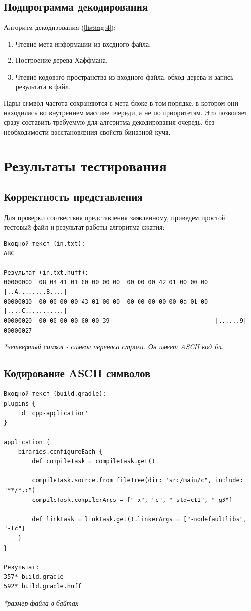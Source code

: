 \documentclass[12pt, a4paper]{article}
\begin{document}
\subsection{Подпрограмма декодирования}
Алгоритм декодирования (\ref{listing:4}):
\begin{enumerate}
  \item Чтение мета информации из входного файла.
  \item Построение дерева Хаффмана.
  \item Чтение кодового пространства из входного файла, обход дерева и
  запись результата в файл.
\end{enumerate}
Пары символ-частота сохраняются в мета блоке в том порядке, в котором они
находились во внутреннем массиве очереди, а не по приоритетам. Это позволяет
сразу составить требуемую для алгоритма декодирования очередь, без
необходимости восстановления свойств бинарной кучи.

\section{Результаты тестирования}
\subsection{Корректность представления}
Для проверки соотвествия представления заявленному, приведем простой
тестовый файл и результат работы алгоритма сжатия:\\
\begin{verbatim}
Входной текст (in.txt):
ABC

Результат (in.txt.huff):
00000000  08 04 41 01 00 00 00 00  00 00 00 42 01 00 00 00  |..A........B....|
00000010  00 00 00 00 43 01 00 00  00 00 00 00 00 0a 01 00  |....C...........|
00000020  00 00 00 00 00 00 39                              |......9|
00000027
\end{verbatim}
\textit{*четвертый символ - символ переноса строки. Он имеет ASCII код 0a.}

\subsection{Кодирование ASCII символов}
\begin{verbatim}
Входной текст (build.gradle):
plugins {
    id 'cpp-application'
}

application {
    binaries.configureEach {
        def compileTask = compileTask.get()

        compileTask.source.from fileTree(dir: "src/main/c", include: "**/*.c")
        compileTask.compilerArgs = ["-x", "c", "-std=c11", "-g3"]

        def linkTask = linkTask.get().linkerArgs = ["-nodefaultlibs", "-lc"]
    }
}

Результат:
357* build.gradle
592* build.gradle.huff
\end{verbatim}
\textit{*размер файла в байтах}
\end{document}
